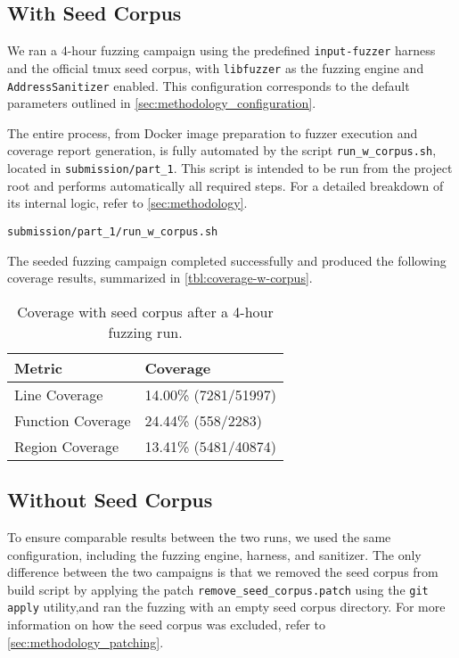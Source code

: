 \subsection{With Seed Corpus} \label{sec:with-seed}

We ran a 4-hour fuzzing campaign using the predefined \texttt{input-fuzzer} harness and the official tmux seed corpus, with \texttt{libfuzzer} as the fuzzing engine and \texttt{AddressSanitizer} enabled. This configuration corresponds to the default parameters outlined in \autoref{sec:methodology_configuration}.

The entire process, from Docker image preparation to fuzzer execution and coverage report generation, is fully automated by the script \texttt{run\_w\_corpus.sh}, located in \texttt{submission/part\_1}. This script is intended to be run from the project root and performs automatically all required steps. For a detailed breakdown of its internal logic, refer to \autoref{sec:methodology}.

\begin{verbatim}
submission/part_1/run_w_corpus.sh
\end{verbatim}

The seeded fuzzing campaign completed successfully and produced the following coverage results, summarized in \autoref{tbl:coverage-w-corpus}.

\begin{table}[ht]
	\centering
	\begin{tabular}{@{}ll@{}}
		\toprule
		\textbf{Metric}   & \textbf{Coverage}    \\
		\midrule
		Line Coverage     & 14.00\% (7281/51997) \\
		Function Coverage & 24.44\% (558/2283)   \\
		Region Coverage   & 13.41\% (5481/40874) \\
		\bottomrule
	\end{tabular}
	\caption{Coverage with seed corpus after a 4-hour fuzzing run.}
	\label{tbl:coverage-w-corpus}
\end{table}

\subsection{Without Seed Corpus} \label{sec:without-seed}

To ensure comparable results between the two runs, we used the same configuration, including the fuzzing engine, harness, and sanitizer. The only difference between the two campaigns is that we removed the seed corpus from build script by applying the patch \texttt{remove\_seed\_corpus.patch} using the \texttt{git apply} utility,and ran the fuzzing with an empty seed corpus directory. For more information on how the seed corpus was excluded, refer to \autoref{sec:methodology_patching}.

